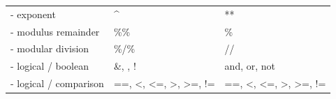 \documentclass[]{book}
\theoremstyle{definition}
\theoremstyle{definition}
\theoremstyle{definition}
\theoremstyle{remark}
\begin{document}
\begin{longtable}[]{@{}lll@{}}
\begin{minipage}[t]{0.19\columnwidth}\raggedright\strut
- exponent\strut
\end{minipage} & \begin{minipage}[t]{0.33\columnwidth}\raggedright\strut
\^{}\strut
\end{minipage} & \begin{minipage}[t]{0.39\columnwidth}\raggedright\strut
**\strut
\end{minipage}\tabularnewline
\begin{minipage}[t]{0.19\columnwidth}\raggedright\strut
- modulus remainder\strut
\end{minipage} & \begin{minipage}[t]{0.33\columnwidth}\raggedright\strut
\%\%\strut
\end{minipage} & \begin{minipage}[t]{0.39\columnwidth}\raggedright\strut
\%\strut
\end{minipage}\tabularnewline
\begin{minipage}[t]{0.19\columnwidth}\raggedright\strut
- modular division\strut
\end{minipage} & \begin{minipage}[t]{0.33\columnwidth}\raggedright\strut
\%/\%\strut
\end{minipage} & \begin{minipage}[t]{0.39\columnwidth}\raggedright\strut
//\strut
\end{minipage}\tabularnewline
\begin{minipage}[t]{0.19\columnwidth}\raggedright\strut
- logical / boolean\strut
\end{minipage} & \begin{minipage}[t]{0.33\columnwidth}\raggedright\strut
\&, \textbar{}, !\strut
\end{minipage} & \begin{minipage}[t]{0.39\columnwidth}\raggedright\strut
and, or, not\strut
\end{minipage}\tabularnewline
\begin{minipage}[t]{0.19\columnwidth}\raggedright\strut
- logical / comparison\strut
\end{minipage} & \begin{minipage}[t]{0.33\columnwidth}\raggedright\strut
==, \textless{}, \textless{}=, \textgreater{}, \textgreater{}=, !=\strut
\end{minipage} & \begin{minipage}[t]{0.39\columnwidth}\raggedright\strut
==, \textless{}, \textless{}=, \textgreater{}, \textgreater{}=, !=\strut

\end{minipage}
\end{longtable}
\end{document}
